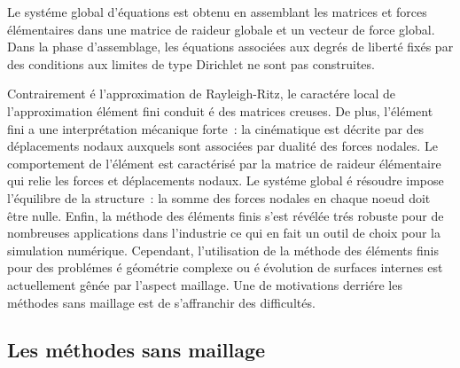 Le syst\'eme global d'\'equations est obtenu en assemblant les
matrices et forces \'el\'ementaires dans une matrice de
raideur globale et un vecteur de force global. Dans la phase
d'assemblage, les \'equations associ\'ees aux degr\'es de libert\'e fix\'es
par des conditions aux limites de type Dirichlet ne sont pas
construites.

Contrairement \'e l'approximation de Rayleigh-Ritz,
le caract\'ere local de l'approximation \'el\'ement fini
conduit \'e des matrices creuses.
De plus, l'\'el\'ement fini a une interpr\'etation m\'ecanique
forte~: la cin\'ematique est d\'ecrite par des d\'eplacements
nodaux auxquels sont associ\'ees par dualit\'e des forces nodales.
Le comportement de l'\'el\'ement est caract\'eris\'e par
la matrice de raideur \'el\'ementaire
qui relie les forces et d\'eplacements nodaux.
Le syst\'eme global \'e r\'esoudre impose
l'\'equilibre de la structure~:
la somme des forces nodales en chaque noeud doit
\^etre nulle.
Enfin, la m\'ethode des \'el\'ements finis s'est r\'ev\'el\'ee
tr\'es robuste pour de nombreuses applications dans l'industrie
ce qui en fait un outil de choix pour la simulation
num\'erique.
Cependant, l'utilisation de la m\'ethode des \'el\'ements finis
pour des probl\'emes \'e g\'eom\'etrie complexe
ou \'e \'evolution de surfaces internes
est actuellement g\^en\'ee  par l'aspect maillage.
Une de motivations derri\'ere les m\'ethodes sans maillage
est de s'affranchir des
difficult\'es.

\subsection{Les m\'ethodes sans maillage}\label{methode_sans_maillage}

